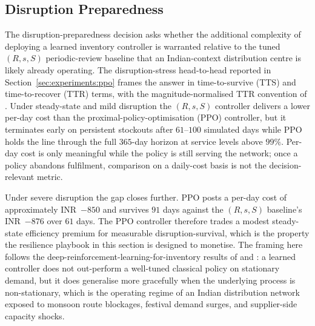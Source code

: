 \documentclass[review,preprint,authoryear,12pt]{elsarticle}
\begin{document}
\begin{table}[H]
\centering
\caption{Sobol global sensitivity indices on the calibrated network:
first-order $S_1$ and total-order $S_T$ with bootstrap $95\%$
confidence intervals.}
\label{tab:sensitivity}

\end{table}

\subsection{Disruption Preparedness}
\label{sec:managerial:disruption}

The disruption-preparedness decision asks whether the additional
complexity of deploying a learned inventory controller is warranted
relative to the tuned $(R, s, S)$ periodic-review baseline that an
Indian-context distribution centre is likely already operating. The
disruption-stress head-to-head reported in
Section~\ref{sec:experiments:ppo} frames the answer in
\citet{sheffi2005resilient} time-to-survive (TTS) and time-to-recover
(TTR) terms, with the magnitude-normalised TTR convention of
\citet{hosseini2019review}. Under steady-state and mild disruption
the $(R, s, S)$ controller delivers a lower per-day cost than the
proximal-policy-optimisation (PPO) controller, but it terminates
early on persistent stockouts after $61$--$100$ simulated days while
PPO holds the line through the full $365$-day horizon at service
levels above $99\%$. Per-day cost is only meaningful while the
policy is still serving the network; once a policy abandons
fulfilment, comparison on a daily-cost basis is not the
decision-relevant metric.

Under severe disruption the gap closes further. PPO posts a per-day
cost of approximately INR~$-850$ and survives $91$ days against the
$(R, s, S)$ baseline's INR~$-876$ over $61$ days. The PPO controller
therefore trades a modest steady-state efficiency premium for
measurable disruption-survival, which is the property the resilience
playbook in this section is designed to monetise. The framing here
follows the deep-reinforcement-learning-for-inventory results of
\citet{boute2022drl_inventory} and
\citet{gijsbrechts2022drl_inventory}: a learned controller does not
out-perform a well-tuned classical policy on stationary demand, but
it does generalise more gracefully when the underlying process is
non-stationary, which is the operating regime of an Indian
distribution network exposed to monsoon route blockages, festival
demand surges, and supplier-side capacity shocks.
\end{document}
